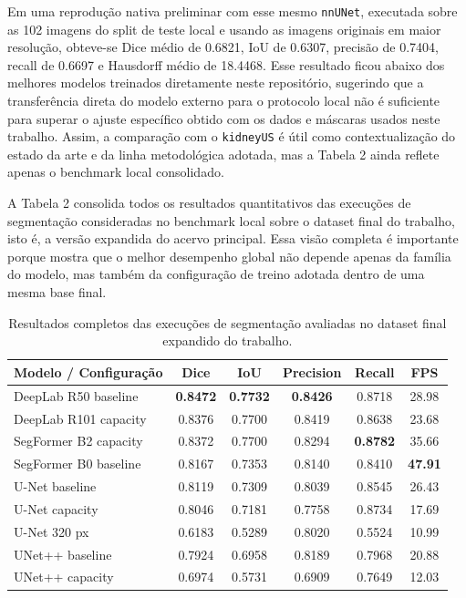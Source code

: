 \documentclass[12pt]{article}
\begin{document}
Em uma reprodução nativa preliminar com esse mesmo \texttt{nnUNet}, executada sobre as 102 imagens do split de teste local e usando as imagens originais em maior resolução, obteve-se Dice médio de 0.6821, IoU de 0.6307, precisão de 0.7404, recall de 0.6697 e Hausdorff médio de 18.4468. Esse resultado ficou abaixo dos melhores modelos treinados diretamente neste repositório, sugerindo que a transferência direta do modelo externo para o protocolo local não é suficiente para superar o ajuste específico obtido com os dados e máscaras usados neste trabalho. Assim, a comparação com o \texttt{kidneyUS} é útil como contextualização do estado da arte e da linha metodológica adotada, mas a Tabela 2 ainda reflete apenas o benchmark local consolidado.

A Tabela 2 consolida todos os resultados quantitativos das execuções de segmentação consideradas no benchmark local sobre o dataset final do trabalho, isto é, a versão expandida do acervo principal. Essa visão completa é importante porque mostra que o melhor desempenho global não depende apenas da família do modelo, mas também da configuração de treino adotada dentro de uma mesma base final.

\begin{table}[H]
\centering
\caption{Resultados completos das execuções de segmentação avaliadas no dataset final expandido do trabalho.}
\label{tab:todos_modelos_segmentacao}
\scriptsize
\begin{tabular}{lccccc}
\hline
\textbf{Modelo / Configuração} & \textbf{Dice} & \textbf{IoU} & \textbf{Precision} & \textbf{Recall} & \textbf{FPS} \\
\hline
DeepLab R50 baseline & \textbf{0.8472} & \textbf{0.7732} & \textbf{0.8426} & 0.8718 & 28.98 \\
DeepLab R101 capacity & 0.8376 & 0.7700 & 0.8419 & 0.8638 & 23.68 \\
SegFormer B2 capacity & 0.8372 & 0.7700 & 0.8294 & \textbf{0.8782} & 35.66 \\
SegFormer B0 baseline & 0.8167 & 0.7353 & 0.8140 & 0.8410 & \textbf{47.91} \\
U-Net baseline & 0.8119 & 0.7309 & 0.8039 & 0.8545 & 26.43 \\
U-Net capacity & 0.8046 & 0.7181 & 0.7758 & 0.8734 & 17.69 \\
U-Net 320 px & 0.6183 & 0.5289 & 0.8020 & 0.5524 & 10.99 \\
UNet++ baseline & 0.7924 & 0.6958 & 0.8189 & 0.7968 & 20.88 \\
UNet++ capacity & 0.6974 & 0.5731 & 0.6909 & 0.7649 & 12.03 \\
\hline
\end{tabular}
\normalsize
\end{table}
\end{document}
